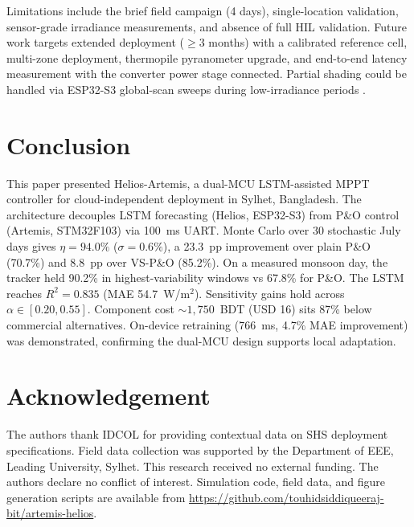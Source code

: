 \documentclass{iaesarticle}
\begin{document}
Limitations include the brief field campaign (4 days), single-location validation, sensor-grade irradiance measurements, and absence of full HIL validation. Future work targets extended deployment ($\geq$3 months) with a calibrated reference cell, multi-zone deployment, thermopile pyranometer upgrade, and end-to-end latency measurement with the converter power stage connected. Partial shading could be handled via ESP32-S3 global-scan sweeps during low-irradiance periods \cite{alshareef2022,sher2015}.

\section{Conclusion}

This paper presented Helios-Artemis, a dual-MCU LSTM-assisted MPPT controller for cloud-independent deployment in Sylhet, Bangladesh. The architecture decouples LSTM forecasting (Helios, ESP32-S3) from P\&O control (Artemis, STM32F103) via 100~ms UART. Monte Carlo over 30 stochastic July days gives $\eta = 94.0\%$ ($\sigma = 0.6\%$), a 23.3~pp improvement over plain P\&O (70.7\%) and 8.8~pp over VS-P\&O (85.2\%). On a measured monsoon day, the tracker held 90.2\% in highest-variability windows vs 67.8\% for P\&O. The LSTM reaches $R^2 = 0.835$ (MAE 54.7~W/m$^2$). Sensitivity gains hold across $\alpha \in [0.20, 0.55]$. Component cost ${\sim}1{,}750$~BDT (USD 16) sits 87\% below commercial alternatives. On-device retraining (766~ms, 4.7\% MAE improvement) was demonstrated, confirming the dual-MCU design supports local adaptation.

\section*{Acknowledgement}
The authors thank IDCOL for providing contextual data on SHS deployment specifications. Field data collection was supported by the Department of EEE, Leading University, Sylhet. This research received no external funding. The authors declare no conflict of interest. Simulation code, field data, and figure generation scripts are available from \url{https://github.com/touhidsiddiqueeraj-bit/artemis-helios}.




\vspace{-.7em}
\end{document}
